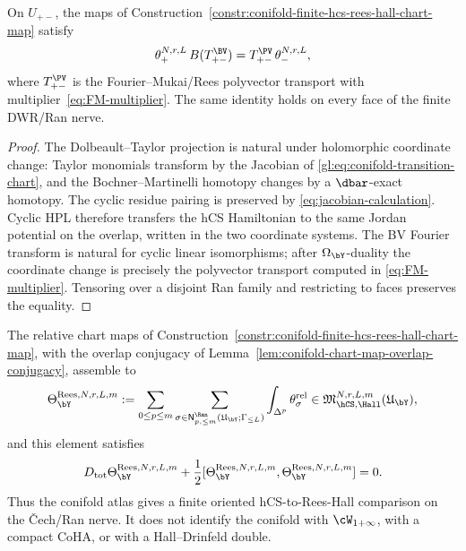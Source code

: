 \begin{lemma}
\label{lem:conifold-chart-map-overlap-conjugacy}
On \(U_{+-}\), the maps of
Construction~\ref{constr:conifold-finite-hcs-rees-hall-chart-map}
satisfy
\[
 \theta_{+}^{N,r,L}\,B(T_{+-}^{\BV})
 =
 T_{+-}^{\PV}\,\theta_{-}^{N,r,L},
\]
where \(T_{+-}^{\PV}\) is the Fourier--Mukai/Rees polyvector transport
with multiplier~\eqref{eq:FM-multiplier}.  The same identity holds on
every face of the finite DWR/Ran nerve.
\end{lemma}

\begin{proof}
The Dolbeault--Taylor projection is natural under holomorphic coordinate
change: Taylor monomials transform by the Jacobian of
\eqref{gl:eq:conifold-transition-chart}, and the
Bochner--Martinelli homotopy changes by a \(\dbar\)-exact homotopy.
The cyclic residue pairing is preserved by
\eqref{eq:jacobian-calculation}.  Cyclic HPL therefore transfers the
hCS Hamiltonian to the same Jordan potential on the overlap, written in
the two coordinate systems.  The BV Fourier transform is natural for
cyclic linear isomorphisms; after \(\Omega_{\bY}\)-duality the
coordinate change is precisely the polyvector transport computed in
\eqref{eq:FM-multiplier}.  Tensoring over a disjoint Ran family and
restricting to faces preserves the equality.
\end{proof}

\begin{proposition}
\label{prop:conifold-cech-ran-rees-mc}
The relative chart maps of
Construction~\ref{constr:conifold-finite-hcs-rees-hall-chart-map},
with the overlap conjugacy of
Lemma~\ref{lem:conifold-chart-map-overlap-conjugacy}, assemble to
\[
 \Theta_{\bY}^{\mathrm{Rees},N,r,L,m}
 :=
 \sum_{0\leq p\leq m}
 \sum_{\sigma\in\mathsf N^{\Ran}_{p,\leq m}
 (\mathfrak U_{\bY};\Gamma_{\leq L})}
 \int_{\Delta^p}\theta_{\sigma}^{\mathrm{rel}}
 \in
 \mathfrak M_{\hCS,\Hall}^{N,r,L,m}(\mathfrak U_{\bY}),
\]
and this element satisfies
\[
 D_{\mathrm{tot}}\Theta_{\bY}^{\mathrm{Rees},N,r,L,m}
 +\frac{1}{2}
 [\Theta_{\bY}^{\mathrm{Rees},N,r,L,m},
  \Theta_{\bY}^{\mathrm{Rees},N,r,L,m}]
 =0.
\]
Thus the conifold atlas gives a finite oriented hCS-to-Rees-Hall
comparison on the \v{C}ech/Ran nerve. It does not identify the conifold
with $\cW_{1+\infty}$, with a compact CoHA, or with a Hall--Drinfeld
double.
\end{proposition}

